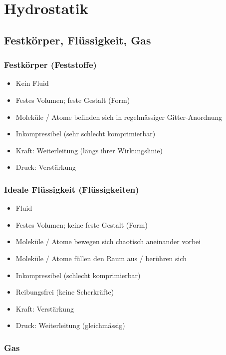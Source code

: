 \section{Hydrostatik}

\subsection{Festkörper, Flüssigkeit, Gas}

\subsubsection*{Festkörper \normalfont (Feststoffe)}

\begin{itemize}
    \item Kein Fluid
    \item Festes Volumen; feste Gestalt (Form)
    \item Moleküle / Atome befinden sich in regelmässiger Gitter-Anordnung
    \item Inkompressibel (sehr schlecht komprimierbar)
    \item Kraft: Weiterleitung (längs ihrer Wirkungslinie)
    \item Druck: Verstärkung 
\end{itemize}


\subsubsection*{Ideale Flüssigkeit \normalfont (Flüssigkeiten)}

\begin{itemize}
    \item Fluid
    \item Festes Volumen; keine feste Gestalt (Form)
    \item Moleküle / Atome bewegen sich chaotisch aneinander vorbei
    \item Moleküle / Atome füllen den Raum aus / berühren sich
    \item Inkompressibel (schlecht komprimierbar)
    \item Reibungsfrei (keine Scherkräfte)
    \item Kraft: Verstärkung
    \item Druck: Weiterleitung (gleichmässig)
\end{itemize}


\subsubsection*{Gas}

